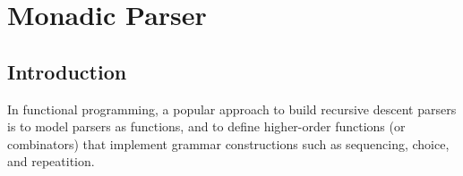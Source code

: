 \chapter{Monadic Parser}

\section{Introduction}

In functional programming, a popular approach to build recursive descent parsers is to model parsers as functions, and to define higher-order functions (or combinators) that implement grammar constructions such as sequencing, choice, and repeatition. \cite{Wadler:1992}

